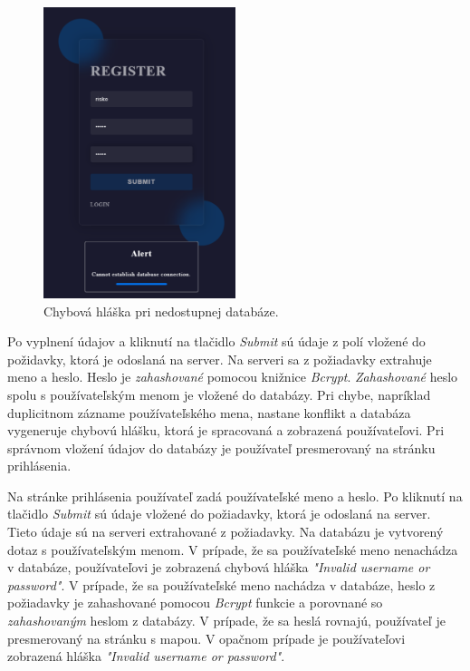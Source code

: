 \begin{figure}[H]
  \centering
  \includegraphics[width=0.5\textwidth]{img/auth/database_error.png}
  \caption{Chybová hláška pri nedostupnej databáze.}
  \label{fig:database_error}
\end{figure}

Po vyplnení údajov a kliknutí na tlačidlo \textit{Submit} sú údaje z polí vložené do požidavky, ktorá je odoslaná na server. Na serveri sa z požiadavky extrahuje meno a heslo. Heslo je \textit{zahashované} pomocou knižnice \textit{Bcrypt}\cite{nodejs-bcrypt}. \textit{Zahashované} heslo spolu s používateľským menom je vložené do databázy. Pri chybe, napríklad duplicitnom zázname používateľského mena, nastane konflikt a databáza vygeneruje chybovú hlášku, ktorá je spracovaná a zobrazená používateľovi. Pri správnom vložení údajov do databázy je používateľ presmerovaný na stránku prihlásenia.

Na stránke prihlásenia používateľ zadá používateľské meno a heslo. Po kliknutí na tlačidlo \textit{Submit} sú údaje vložené do požiadavky, ktorá je odoslaná na server. Tieto údaje sú na serveri extrahované z požiadavky. Na databázu je vytvorený dotaz s používateľským menom. V prípade, že sa používateľské meno nenachádza v databáze, používateľovi je zobrazená chybová hláška \textit{"Invalid username or password"}. V prípade, že sa používateľské meno nachádza v databáze, heslo z požiadavky je zahashované pomocou \textit{Bcrypt} funkcie a porovnané so \textit{zahashovaným} heslom z databázy. V prípade, že sa heslá rovnajú, používateľ je presmerovaný na stránku s mapou. V opačnom prípade je používateľovi zobrazená hláška \textit{"Invalid username or password"}.

